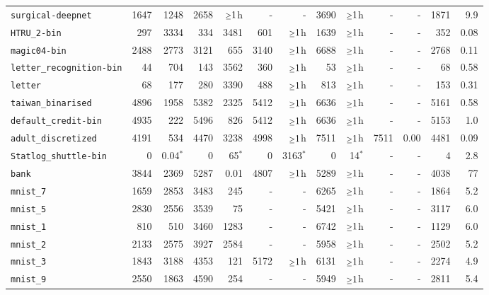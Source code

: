 \begin{tabular}{lrrrrrrrrrrrr}
\texttt{surgical-deepnet} & 1647 & 1248 & 2658 & $\mathsmaller{\geq}1$h & - & - & 3690 & $\mathsmaller{\geq}1$h & - & - & 1871 & 9.9\\
\texttt{HTRU\_2-bin} & 297 & 3334 & 334 & 3481 & 601 & $\mathsmaller{\geq}1$h & 1639 & $\mathsmaller{\geq}1$h & - & - & 352 & 0.08\\
\texttt{magic04-bin} & 2488 & 2773 & 3121 & 655 & 3140 & $\mathsmaller{\geq}1$h & 6688 & $\mathsmaller{\geq}1$h & - & - & 2768 & 0.11\\
\texttt{letter\_recognition-bin} & 44 & 704 & 143 & 3562 & 360 & $\mathsmaller{\geq}1$h & 53 & $\mathsmaller{\geq}1$h & - & - & 68 & 0.58\\
\texttt{letter} & 68 & 177 & 280 & 3390 & 488 & $\mathsmaller{\geq}1$h & 813 & $\mathsmaller{\geq}1$h & - & - & 153 & 0.31\\
\texttt{taiwan\_binarised} & 4896 & 1958 & 5382 & 2325 & 5412 & $\mathsmaller{\geq}1$h & 6636 & $\mathsmaller{\geq}1$h & - & - & 5161 & 0.58\\
\texttt{default\_credit-bin} & 4935 & 222 & 5496 & 826 & 5412 & $\mathsmaller{\geq}1$h & 6636 & $\mathsmaller{\geq}1$h & - & - & 5153 & 1.0\\
\texttt{adult\_discretized} & 4191 & 534 & 4470 & 3238 & 4998 & $\mathsmaller{\geq}1$h & 7511 & $\mathsmaller{\geq}1$h & 7511 & 0.00 & 4481 & 0.09\\
\texttt{Statlog\_shuttle-bin} & 0 & 0.04$^*$ & 0 & 65$^*$ & 0 & 3163$^*$ & 0 & 14$^*$ & - & - & 4 & 2.8\\
\texttt{bank} & 3844 & 2369 & 5287 & 0.01 & 4807 & $\mathsmaller{\geq}1$h & 5289 & $\mathsmaller{\geq}1$h & - & - & 4038 & 77\\
\texttt{mnist\_7} & 1659 & 2853 & 3483 & 245 & - & - & 6265 & $\mathsmaller{\geq}1$h & - & - & 1864 & 5.2\\
\texttt{mnist\_5} & 2830 & 2556 & 3539 & 75 & - & - & 5421 & $\mathsmaller{\geq}1$h & - & - & 3117 & 6.0\\
\texttt{mnist\_1} & 810 & 510 & 3460 & 1283 & - & - & 6742 & $\mathsmaller{\geq}1$h & - & - & 1129 & 6.0\\
\texttt{mnist\_2} & 2133 & 2575 & 3927 & 2584 & - & - & 5958 & $\mathsmaller{\geq}1$h & - & - & 2502 & 5.2\\
\texttt{mnist\_3} & 1843 & 3188 & 4353 & 121 & 5172 & $\mathsmaller{\geq}1$h & 6131 & $\mathsmaller{\geq}1$h & - & - & 2274 & 4.9\\
\texttt{mnist\_9} & 2550 & 1863 & 4590 & 254 & - & - & 5949 & $\mathsmaller{\geq}1$h & - & - & 2811 & 5.4\\

\end{tabular}
